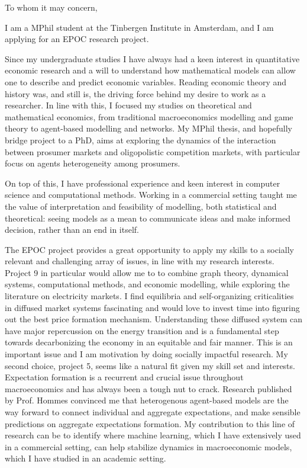\documentclass{letter}
\begin{document}
\begin{letter}{}

    \opening{To whom it may concern,}

    I am a MPhil student at the Tinbergen Institute in Amsterdam, and I am applying for an EPOC research project.

    Since my undergraduate studies I have always had a keen interest in quantitative economic research and a will to understand how mathematical models can allow one to describe and predict economic variables. Reading economic theory and history was, and still is, the driving force behind my desire to work as a researcher. In line with this, I focused my studies on theoretical and mathematical economics, from traditional macroeconomics modelling and game theory to agent-based modelling and networks. My MPhil thesis, and hopefully bridge project to a PhD, aims at exploring the dynamics of the interaction between prosumer markets and oligopolistic competition markets, with particular focus on agents heterogeneity among prosumers.

    On top of this, I have professional experience and keen interest in computer science and computational methods. Working in a commercial setting taught me the value of interpretation and feasibility of modelling, both statistical and theoretical: seeing models as a mean to communicate ideas and make informed decision, rather than an end in itself.


    The EPOC project provides a great opportunity to apply my skills to a socially relevant and challenging array of issues, in line with my research interests. Project 9 in particular would allow me to to combine graph theory, dynamical systems, computational methods, and economic modelling, while exploring the literature on electricity markets. I find equilibria and self-organizing criticalities in diffused market systems fascinating and would love to invest time into figuring out the best price formation mechanism. Understanding these diffused system can have major repercussion on the energy transition and is a fundamental step towards decarbonizing the economy in an equitable and fair manner. This is an important issue and I am motivation by doing socially impactful research. My second choice, project 5, seems like a natural fit given my skill set and interests. Expectation formation is a recurrent and crucial issue throughout macroeconomics and has always been a tough nut to crack. Research published by Prof. Hommes convinced me that heterogenous agent-based models are the way forward to connect individual and aggregate expectations, and make sensible predictions on aggregate expectations formation. My contribution to this line of research can be to identify where machine learning, which I have extensively used in a commercial setting, can help stabilize dynamics in macroeconomic models, which I have studied in an academic setting.


\end{letter}
\end{document}
